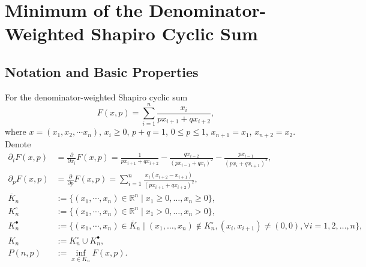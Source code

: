 \documentclass[a4paper,fleqn,numbers]{cas-sc}
\newtheorem{theorem}{Theorem}[section]
\newtheorem*{remark}{Remark}
\begin{document}
%	
%	
	
	\section{Minimum of the Denominator-Weighted Shapiro Cyclic Sum}
	
	\subsection{Notation and Basic Properties}
	
	For the denominator-weighted Shapiro cyclic sum
	\[
	F(x,p)=\sum_{i=1}^{n} \frac{x_i}{px_{i+1}+qx_{i+2}},
	\]
	where $x=(x_1,x_2,\cdots x_n)$, $x_i\geq 0$, $p+q=1$, $0\leq p \leq 1$, $x_{n+1}=x_1$, $x_{n+2}=x_2$. Denote
	\begin{align*}
		\partial_i F(x,p) &= \frac{\partial}{\partial x_i} F(x,p) = \frac{1}{px_{i+1}+qx_{i+2}} - \frac{qx_{i-2}}{(px_{i-1}+qx_i)^2} - \frac{px_{i-1}}{(px_i+qx_{i+1})^2}, \\
		\partial_p F(x,p) &= \frac{\partial}{\partial p} F(x,p) = \sum_{i=1}^{n} \frac{x_i (x_{i+2} - x_{i+1})}{(px_{i+1} + qx_{i+2})^2}, \\
		\overline{K}_n &:= \{(x_1, \cdots, x_n) \in \mathbb{R}^n \mid x_1 \geq 0, \ldots, x_n \geq 0\}, \\
		K_n^\circ &:= \{(x_1, \cdots, x_n) \in \mathbb{R}^n \mid x_1 > 0, \ldots, x_n > 0\}, \\
		K_n^{\bullet} &:= \{(x_1, \cdots, x_n) \in \overline{K}_n \mid (x_1, \ldots, x_n) \notin K_n^{\circ}, (x_i, x_{i+1}) \neq (0,0),\forall i =1,2,\ldots,n\}, \\
		K_n &:= K_n^\circ \cup K_n^{\bullet}, \\
		P(n,p) &:=\inf\limits_{x \in K_n} F(x,p).
	\end{align*}
	
\end{document}
